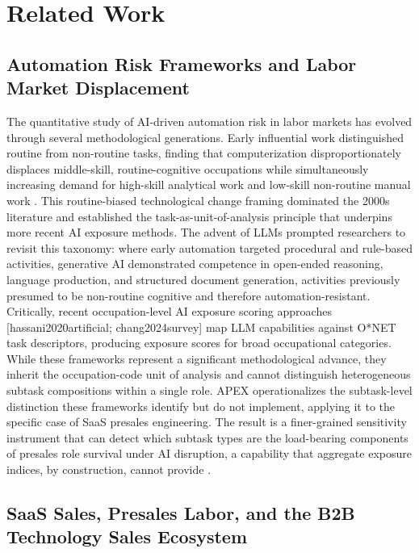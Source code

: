 \documentclass[10pt, conference]{IEEEtran}
\begin{document}
\section{Related Work}

\label{sec:related_work}

\subsection{Automation Risk Frameworks and Labor Market Displacement}

\label{sec:automation_risk_frameworks_and_labor_mar}

The quantitative study of AI-driven automation risk in labor markets has evolved through several methodological generations. Early influential work distinguished routine from non-routine tasks, finding that computerization disproportionately displaces middle-skill, routine-cognitive occupations while simultaneously increasing demand for high-skill analytical work and low-skill non-routine manual work \cite{santana2020future}. This routine-biased technological change framing dominated the 2000s literature and established the task-as-unit-of-analysis principle that underpins more recent AI exposure methods. The advent of LLMs prompted researchers to revisit this taxonomy: where early automation targeted procedural and rule-based activities, generative AI demonstrated competence in open-ended reasoning, language production, and structured document generation, activities previously presumed to be non-routine cognitive and therefore automation-resistant. Critically, recent occupation-level AI exposure scoring approaches [hassani2020artificial; chang2024survey] map LLM capabilities against O*NET task descriptors, producing exposure scores for broad occupational categories. While these frameworks represent a significant methodological advance, they inherit the occupation-code unit of analysis and cannot distinguish heterogeneous subtask compositions within a single role. APEX operationalizes the subtask-level distinction these frameworks identify but do not implement, applying it to the specific case of SaaS presales engineering. The result is a finer-grained sensitivity instrument that can detect which subtask types are the load-bearing components of presales role survival under AI disruption, a capability that aggregate exposure indices, by construction, cannot provide \cite{martinezplumed2020futures}.

\subsection{SaaS Sales, Presales Labor, and the B2B Technology Sales Ecosystem}
\end{document}
